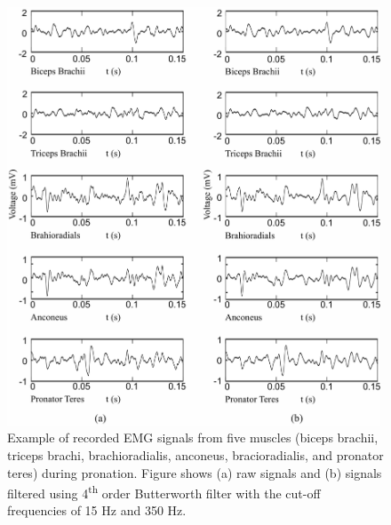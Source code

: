 \begin{figure}[ht]
\centering
\includegraphics[width=0.99\textwidth]{Images/figure3_B5.png}
\caption{Example of recorded EMG signals from five muscles (biceps brachii, triceps brachi, brachioradialis, anconeus, bracioradialis, and pronator teres) during pronation. Figure shows (a) raw signals and (b) signals filtered using 4\textsuperscript{th} order Butterworth filter with the cut-off frequencies of 15 Hz and 350 Hz.}
\label{fig:3-B5}
\end{figure}   
